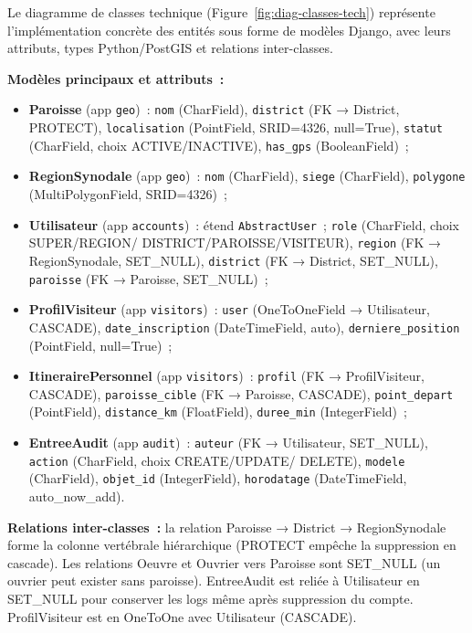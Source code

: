 \documentclass[12pt, a4paper]{report}
\begin{document}
Le diagramme de classes technique (Figure~\ref{fig:diag-classes-tech})
représente l'implémentation concrète des entités sous forme de modèles Django,
avec leurs attributs, types Python/PostGIS et relations inter-classes.

\noindent\textbf{Modèles principaux et attributs~:}
\begin{itemize}[itemsep=2pt, topsep=4pt, leftmargin=1.5cm]
  \item \textbf{Paroisse} (app \texttt{geo})~: \texttt{nom} (CharField),
    \texttt{district} (FK → District, PROTECT), \texttt{localisation}
    (PointField, SRID=4326, null=True), \texttt{statut} (CharField, choix
    ACTIVE/INACTIVE), \texttt{has\_gps} (BooleanField)~;
  \item \textbf{RegionSynodale} (app \texttt{geo})~: \texttt{nom} (CharField),
    \texttt{siege} (CharField), \texttt{polygone} (MultiPolygonField,
    SRID=4326)~;
  \item \textbf{Utilisateur} (app \texttt{accounts})~: étend
    \texttt{AbstractUser}~; \texttt{role} (CharField, choix SUPER/REGION/
    DISTRICT/PAROISSE/VISITEUR), \texttt{region} (FK → RegionSynodale,
    SET\_NULL), \texttt{district} (FK → District, SET\_NULL), \texttt{paroisse}
    (FK → Paroisse, SET\_NULL)~;
  \item \textbf{ProfilVisiteur} (app \texttt{visitors})~: \texttt{user}
    (OneToOneField → Utilisateur, CASCADE), \texttt{date\_inscription}
    (DateTimeField, auto), \texttt{derniere\_position} (PointField, null=True)~;
  \item \textbf{ItinerairePersonnel} (app \texttt{visitors})~: \texttt{profil}
    (FK → ProfilVisiteur, CASCADE), \texttt{paroisse\_cible} (FK → Paroisse,
    CASCADE), \texttt{point\_depart} (PointField), \texttt{distance\_km}
    (FloatField), \texttt{duree\_min} (IntegerField)~;
  \item \textbf{EntreeAudit} (app \texttt{audit})~: \texttt{auteur} (FK →
    Utilisateur, SET\_NULL), \texttt{action} (CharField, choix CREATE/UPDATE/
    DELETE), \texttt{modele} (CharField), \texttt{objet\_id} (IntegerField),
    \texttt{horodatage} (DateTimeField, auto\_now\_add).
\end{itemize}

\noindent\textbf{Relations inter-classes~:} la relation Paroisse → District →
RegionSynodale forme la colonne vertébrale hiérarchique (PROTECT empêche la
suppression en cascade). Les relations Oeuvre et Ouvrier vers Paroisse sont
SET\_NULL (un ouvrier peut exister sans paroisse). EntreeAudit est reliée à
Utilisateur en SET\_NULL pour conserver les logs même après suppression du
compte. ProfilVisiteur est en OneToOne avec Utilisateur (CASCADE).
\end{document}
